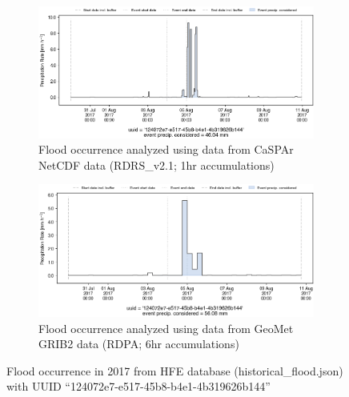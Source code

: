 \documentclass[10pt,a4paper,titlepage,parskip]{scrartcl}
\begin{document}
\begin{figure}[h]
	\begin{subfigure}[a]{1.0\textwidth}
		\centering
		\includegraphics[width=\linewidth]{figures/compare_Geomet_CaSPAr/interpolated_at_stations_occurrence_1054_identified-timesteps_RDRS_v2.1.png}
		\caption{Flood occurrence analyzed using data from CaSPAr NetCDF data (RDRS\_v2.1; 1hr accumulations)}
	\end{subfigure}
	\par\bigskip\bigskip
	\begin{subfigure}[b]{1.0\textwidth}
		\centering
		\includegraphics[width=\linewidth]{figures/compare_Geomet_CaSPAr/interpolated_at_stations_occurrence_1054_identified-timesteps_rdpa:10km:6f.png}
		\caption{Flood occurrence analyzed using data from GeoMet GRIB2 data (RDPA; 6hr accumulations)}
	\end{subfigure}
	\par\bigskip\bigskip
	\caption{Flood occurrence in 2017 from HFE database (historical\_flood.json) with UUID ``124072e7-e517-45b8-b4e1-4b319626b144''}
\end{figure}
\pagebreak
\end{document}
